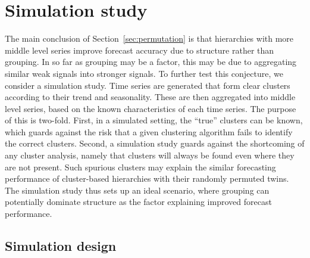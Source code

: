 \documentclass[a4paper,review,12pt,authoryear]{elsarticle}
\begin{document}
\section{Simulation study}
\label{sec:simulation}
The main conclusion of Section~\ref{sec:permutation} is that hierarchies with more middle level series improve forecast accuracy due to structure rather than grouping. In so far as grouping may be a factor, this may be due to aggregating similar weak signals into stronger signals. To further test this conjecture, we consider a simulation study. Time series are generated that form clear clusters according to their trend and seasonality. These are then aggregated into middle level series, based on the known characteristics of each time series. The purpose of this is two-fold. First, in a simulated setting, the ``true'' clusters can be known, which guards against the risk that a given clustering algorithm fails to identify the correct clusters. Second, a simulation study guards against the shortcoming of any cluster analysis, namely that clusters will always be found even where they are not present. Such spurious clusters may explain the similar forecasting performance of cluster-based hierarchies with their randomly permuted twins. The simulation study thus sets up an ideal scenario, where grouping can potentially dominate structure as the factor explaining improved forecast performance.





\subsection{Simulation design}
\end{document}
